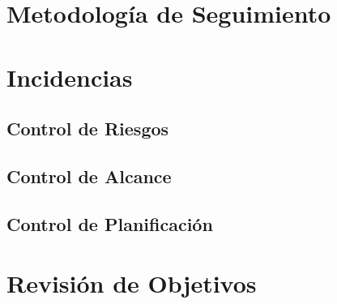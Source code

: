 \section{Metodología de Seguimiento}

\section{Incidencias}

\subsection{Control de Riesgos}

\subsection{Control de Alcance}

\subsection{Control de Planificación}

\section{Revisión de Objetivos}
